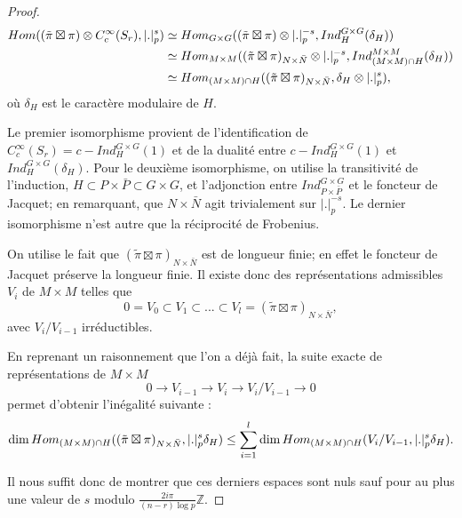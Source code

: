 \begin{proof}
\begin{equation}
\label{isom}
\begin{split}
\operatorname{\mathnormal{Hom}}( (\tilde{\pi} \boxtimes \pi) \otimes C_c^\infty(S_r), |.|_p^s) &\simeq \operatorname{\mathnormal{Hom}}_{G \times G}( (\tilde{\pi} \boxtimes \pi) \otimes |.|_p^{-s}, Ind_H^{G \times G}(\delta_H)) \\
&\simeq \operatorname{\mathnormal{Hom}}_{M \times M}( (\tilde{\pi} \boxtimes \pi)_{N \times \bar{N}} \otimes |.|_p^{-s}, Ind_{(M \times M)\cap H}^{M \times M}(\delta_H)) \\
&\simeq \operatorname{\mathnormal{Hom}}_{(M \times M) \cap H}( (\tilde{\pi} \boxtimes \pi)_{N \times \bar{N}}, \delta_H \otimes |.|_p^s),
\end{split}
\end{equation}
où $\delta_H$ est le caractère modulaire de $H$.

Le premier isomorphisme provient de l'identification de $C_c^\infty(S_r)=c-Ind_H^{G \times G}(1)$ et de la dualité entre $c-Ind_H^{G \times G}(1)$ et $Ind_H^{G \times G}(\delta_H)$. Pour le deuxième isomorphisme, on utilise la transitivité de l'induction, $H \subset P \times \bar{P} \subset G \times G$, et l'adjonction entre $Ind_{P \times \bar{P}}^{G \times G}$ et le foncteur de Jacquet; en remarquant, que $N \times \bar{N}$ agit trivialement sur $|.|_p^{-s}$. Le dernier isomorphisme n'est autre que la réciprocité de Frobenius.

On utilise le fait que $(\tilde{\pi} \boxtimes \pi)_{N \times \bar{N}}$ est de longueur finie; en effet le foncteur de Jacquet préserve la longueur finie. Il existe donc des représentations admissibles $V_i$ de $M \times M$ telles que
\begin{equation}
0=V_0 \subset V_1 \subset ... \subset V_l = (\tilde{\pi} \boxtimes \pi)_{N \times \bar{N}},
\end{equation}
avec $V_i/V_{i-1}$ irréductibles.

En reprenant un raisonnement que l'on a déjà fait, la suite exacte de représentations de $M \times M$
\begin{equation}
0 \rightarrow V_{i-1} \rightarrow V_i \rightarrow V_i/V_{i-1} \rightarrow 0
\end{equation}
permet d'obtenir l'inégalité suivante :
\begin{equation}
\dim \operatorname{\mathnormal{Hom}}_{(M \times M)\cap H} ((\tilde{\pi} \boxtimes \pi)_{N \times \bar{N}}, |.|_p^s\delta_H) \leq \sum_{i=1}^{l} \dim \operatorname{\mathnormal{Hom}}_{(M \times M)\cap H} (V_i/V_{i-1}, |.|_p^s\delta_H).
\end{equation}

Il nous suffit donc de montrer que ces derniers espaces sont nuls sauf pour au plus une valeur de $s$ modulo $\frac{2i\pi}{(n-r)\log p}\mathbb{Z}$.


\end{proof}
